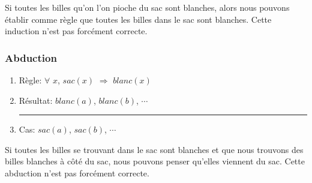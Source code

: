 Si toutes les billes qu'on l'on pioche du sac sont blanches, alors nous pouvons établir comme règle que toutes les billes dans le sac sont blanches. Cette induction n'est pas forcément correcte.

\subsubsection{Abduction}

\begin{enumerate}
  \item Règle: $\forall$ $x$, $sac(x)$ $\Rightarrow$ $blanc(x)$
  \item Résultat: $blanc(a)$, $blanc(b)$, $\cdots$\\
  \rule{5.5cm}{.1pt}
  \item Cas: $sac(a)$, $sac(b)$, $\cdots$
\end{enumerate}

Si toutes les billes se trouvant dans le sac sont blanches et que nous trouvons des billes blanches à côté du sac, nous pouvons penser qu'elles viennent du sac. Cette abduction n'est pas forcément correcte.
